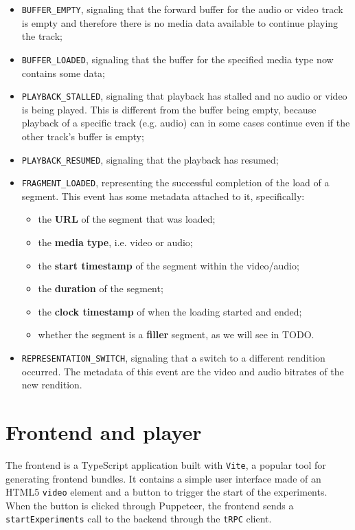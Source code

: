 \begin{itemize}
    \item \texttt{BUFFER\_EMPTY}, signaling that the forward buffer for the audio or video track is empty and therefore there is no media data available to continue playing the track;
    \item \texttt{BUFFER\_LOADED}, signaling that the buffer for the specified media type now contains some data;
    \item \texttt{PLAYBACK\_STALLED}, signaling that playback has stalled and no audio or video is being played. This is different from the buffer being empty, because playback of a specific track (e.g. audio) can in some cases continue even if the other track's buffer is empty;
    \item \texttt{PLAYBACK\_RESUMED}, signaling that the playback has resumed;
    \item \texttt{FRAGMENT\_LOADED}, representing the successful completion of the load of a segment. This event has some metadata attached to it, specifically:
        \begin{itemize}
            \item the \textbf{URL} of the segment that was loaded;
            \item the \textbf{media type}, i.e. video or audio;
            \item the \textbf{start timestamp} of the segment within the video/audio;
            \item the \textbf{duration} of the segment;
            \item the \textbf{clock timestamp} of when the loading started and ended;
            \item whether the segment is a \textbf{filler} segment, as we will see in TODO.
        \end{itemize}
    \item \texttt{REPRESENTATION\_SWITCH}, signaling that a switch to a different rendition occurred. The metadata of this event are the video and audio bitrates of the new rendition.
\end{itemize}

\section{Frontend and player}
\label{sec:testbed/frontend}

The frontend is a TypeScript application built with \texttt{Vite}, a popular tool for generating frontend bundles. It contains a simple user interface made of an HTML5 \texttt{video} element and a button to trigger the start of the experiments. When the button is clicked through Puppeteer, the frontend sends a \texttt{startExperiments} call to the backend through the \texttt{tRPC} client.

